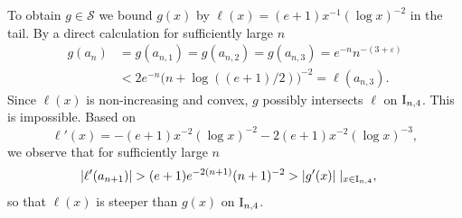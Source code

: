 \documentclass[12pt,leqno]{amsart}
\newcommand{\rI}{{\rm I}}
\newcommand{\vep}{\varepsilon}
\newcommand{\cals}{{\mathcal S}}
\newcommand{\1}{{\mathbf 1}}
\begin{document}
To obtain $g\in \cals$ we bound $g(x)$ by $\ell(x)=(e+1)x^{-1}(\log x)^{-2}$ in the tail. 
By a direct calculation for sufficiently large $n$ 
\begin{align*}
g(a_{n}) &=g(a_{n,1}) =g(a_{n,2})=g(a_{n,3}) =  e^{-n}n^{-(3+\vep)} \\
&< 2e^{-n}  \big(n+\log((e+1)/2) \big)^{-2} = \ell (a_{n,3}). 
\end{align*}
Since $\ell(x)$ is non-increasing and convex, $g$ possibly intersects $\ell$ on $\rI_{n,4}$. %
This is impossible. Based on 
\[
 \ell'(x) =-(e+1) x^{-2} (\log x)^{-2}-2(e+1)x^{-2}(\log x)^{-3},
\]
we observe that for sufficiently large $n$
\begin{align*}
 |\ell'(a_{n+1})| &> (e+1)e^{-2(n+1)}(n+1)^{-2} 
> |g'(x)|\mid_{x\in \rI_{n,4}},
\end{align*}
so that $\ell(x)$ is steeper than $g(x)$ on $\rI_{n,4}$. 
\end{document}
